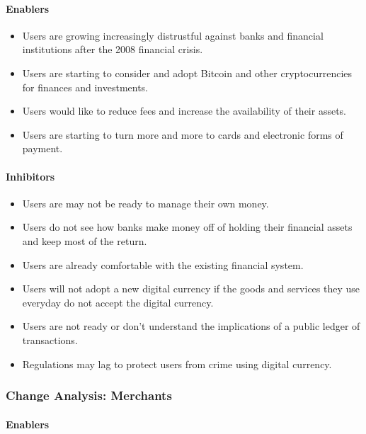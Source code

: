 \documentclass[12pt]{article} %
\begin{document}
{\paragraph*{Enablers}

\begin{itemize}
	\item Users are growing increasingly distrustful against banks and financial institutions after the 2008 financial crisis.
	\item Users are starting to consider and adopt Bitcoin and other cryptocurrencies for finances and investments.
	\item Users would like to reduce fees and increase the availability of their assets.
	\item Users are starting to turn more and more to cards and electronic forms of payment.
\end{itemize}

\paragraph*{Inhibitors}

\begin{itemize}
	\item Users are may not be ready to manage their own money.
	\item Users do not see how banks make money off of holding their financial assets and keep most of the return.
	\item Users are already comfortable with the existing financial system.
	\item Users will not adopt a new digital currency if the goods and services they use everyday do not accept the digital currency.
	\item Users are not ready or don't understand the implications of a public ledger of transactions.
	\item Regulations may lag to protect users from crime using digital currency.
\end{itemize}

\subsubsection{Change Analysis: Merchants} \label{sssec:4.5:merchants}

\paragraph*{Enablers}

}
\end{document}
